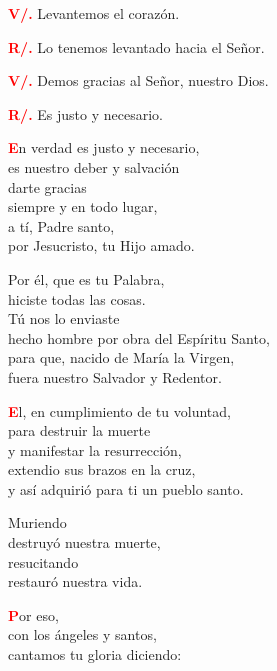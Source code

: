 \documentclass[12pt, letterpaper]{report}
\begin{document}
\noindent
\Large {\bfseries \textcolor{red}{V/.}} \hspace{0.5cm} Levantemos el coraz\'on.

\noindent
\Large {\bfseries \textcolor{red}{R/.}} \hspace{0.5cm} Lo tenemos levantado hacia el Se\~nor. 

\noindent
\Large {\bfseries \textcolor{red}{V/.}} \hspace{0.5cm} Demos gracias al Se\~nor, nuestro Dios.

\noindent
\Large {\bfseries \textcolor{red}{R/.}} \hspace{0.5cm} Es justo y necesario.

\newpage

\lettrine[lines=2]{\bfseries \textcolor{red}{E}}{}\Large n verdad es justo y necesario,\\
es nuestro deber y salvaci\'on\\
darte gracias\\
siempre y en todo lugar,\\
a t\'i, Padre santo,\\
por Jesucristo, tu Hijo amado.

\noindent
\Large Por \'el, que es tu Palabra,\\
hiciste todas las cosas.\\
T\'u nos lo enviaste\\
hecho hombre por obra del Esp\'iritu Santo,\\
para que, nacido de Mar\'ia la Virgen,\\
fuera nuestro Salvador y Redentor.

\lettrine[lines=2]{\bfseries \textcolor{red}{E}}{}\Large l, en cumplimiento de tu voluntad,\\
para destruir la muerte\\
y manifestar la resurrecci\'on,\\
extendio sus brazos en la cruz,\\
y as\'i adquiri\'o para ti un pueblo santo.

\noindent
\Large Muriendo\\
destruy\'o nuestra muerte,\\
resucitando\\
restaur\'o nuestra vida.

\lettrine[lines=2]{\bfseries \textcolor{red}{P}}{}\Large or eso,\\
con los \'angeles y santos,\\
cantamos tu gloria diciendo:
    
\end{document}
